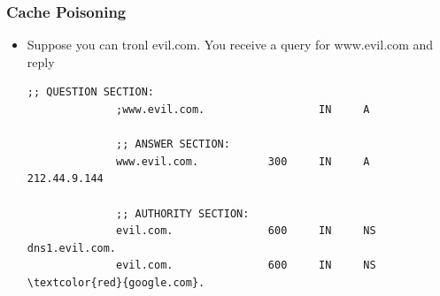 \subsubsection{Cache Poisoning}
\begin{itemize}[nosep]
    \item Suppose you can tronl evil.com. You receive a query for www.evil.com and reply
          \begin{Verbatim}[commandchars=\\\{\}]
              ;; QUESTION SECTION:
              ;www.evil.com.                  IN     A

              ;; ANSWER SECTION:
              www.evil.com.           300     IN     A     212.44.9.144

              ;; AUTHORITY SECTION:
              evil.com.               600     IN     NS    dns1.evil.com.
              evil.com.               600     IN     NS    \textcolor{red}{google.com}.


\end{Verbatim}
\end{itemize}
